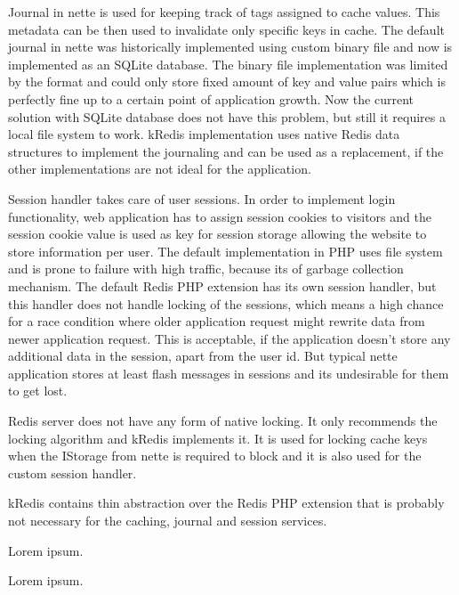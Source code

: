 Journal in \gls{nette} is used for keeping track of tags assigned to cache values. This metadata can be then used to invalidate only specific keys in cache. The default journal in \gls{nette} was historically implemented using custom binary file and now is implemented as an SQLite database. The binary file implementation was limited by the format and could only store fixed amount of key and value pairs which is perfectly fine up to a certain point of application growth. Now the current solution with SQLite database does not have this problem, but still it requires a local file system to work. \gls{kRedis} implementation uses native Redis data structures to implement the journaling and can be used as a replacement, if the other implementations are not ideal for the application.

Session handler takes care of user sessions. In order to implement login functionality, web application has to assign session cookies to visitors and the session cookie value is used as key for session storage allowing the website to store information per user. The default implementation in PHP uses file system and is prone to failure with high traffic, because its of garbage collection mechanism. The default Redis PHP extension has its own session handler, but this handler does not handle locking of the sessions, which means a high chance for a race condition where older application request might rewrite data from newer application request. This is acceptable, if the application doesn't store any additional data in the session, apart from the user id. But typical \gls{nette} application stores at least flash messages in sessions and its undesirable for them to get lost.

Redis server does not have any form of native locking. It only recommends the locking algorithm  and \gls{kRedis} implements it.
It is used for locking cache keys when the IStorage from \gls{nette} is required to block and it is also used for the custom session handler.

\gls{kRedis} contains thin abstraction over the Redis PHP extension that is probably not necessary for the caching, journal and session services.

 \label{sec:state:monolog}

Lorem ipsum.

 \label{sec:state:elastic-search}

Lorem ipsum.

